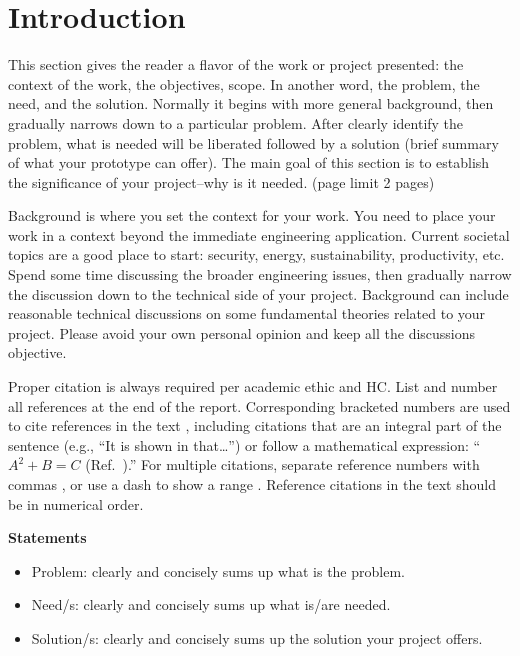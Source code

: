 \documentclass{engr1000j-s2}
\begin{document}
  \newpage
  \tableofcontents
  \thispagestyle{mystyle}
  \newpage

  \section{Introduction}
  This section gives the reader a flavor of the work or project presented: the
  context of the work, the objectives, scope. In another word, the problem, the need,
  and the solution. Normally it begins with more general background, then
  gradually narrows down to a particular problem. After clearly identify the problem,
  what is needed will be liberated followed by a solution (brief summary of what
  your prototype can offer). The main goal of this section is to establish the significance
  of your project--why is it needed. (page limit 2 pages)

  Background is where you set the context for your work. You need to place your work
  in a context beyond the immediate engineering application. Current societal
  topics are a good place to start: security, energy, sustainability,
  productivity, etc. Spend some time discussing the broader engineering issues, then
  gradually narrow the discussion down to the technical side of your project.
  Background can include reasonable technical discussions on some fundamental
  theories related to your project. Please avoid your own personal opinion and keep
  all the discussions objective.

  Proper citation is always required per academic ethic and HC. List and number all references at the end of the report. Corresponding bracketed numbers are used to cite references in the text \cite{vatistas1986reverse}, including citations that are an integral part of the sentence (e.g., ``It is shown in \cite{dornheim1996planetary} that\ldots '') or follow a mathematical expression: ``$A^{2} + B = C$ (Ref.~\cite{terster1997nasa}).'' For multiple citations, separate reference numbers with commas \cite{peyret2012computational,oates1997aerothermodynamics}, or use a dash to show a range \cite{volpe1994techniques,thompsonspacecraft,chi1993fluid,brandis2016nonequi}. Reference citations in the text should be in numerical order. 





  \hspace{1em}

  \textbf{Statements}
  \begin{itemize}
    \item Problem: clearly and concisely sums up what is the problem.\\

    \item Need/s: clearly and concisely sums up what is/are needed.\\

    \item Solution/s: clearly and concisely sums up the solution your project
      offers.
  \end{itemize}
\end{document}
